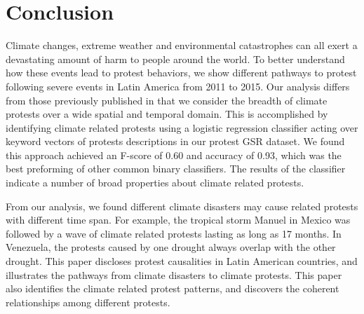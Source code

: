 \section{Conclusion}
Climate changes, extreme weather and environmental catastrophes can all exert a devastating amount of harm to people around the world.
To better understand how these events lead to protest behaviors, we show different pathways to protest following severe events in Latin America from 2011 to 2015.
Our analysis differs from those previously published in that we consider the breadth of climate protests over a wide spatial and temporal domain.
This is accomplished by identifying climate related protests using a logistic regression classifier acting over keyword vectors of protests descriptions in our protest GSR dataset.
We found this approach achieved an F-score of 0.60 and accuracy of 0.93, which was the best preforming of other common binary classifiers.
The results of the classifier indicate a number of broad properties about climate related protests.

From our analysis, we found different climate disasters may cause related protests with different time span.
For example, the tropical storm Manuel in Mexico was followed by a wave of climate related protests lasting as long as 17 months.
In Venezuela, the protests caused by one drought always overlap with the other drought. This paper discloses protest causalities in Latin American countries, and illustrates the pathways from climate disasters to climate protests. This paper also identifies the climate related protest patterns, and discovers the coherent relationships among different protests.




%


